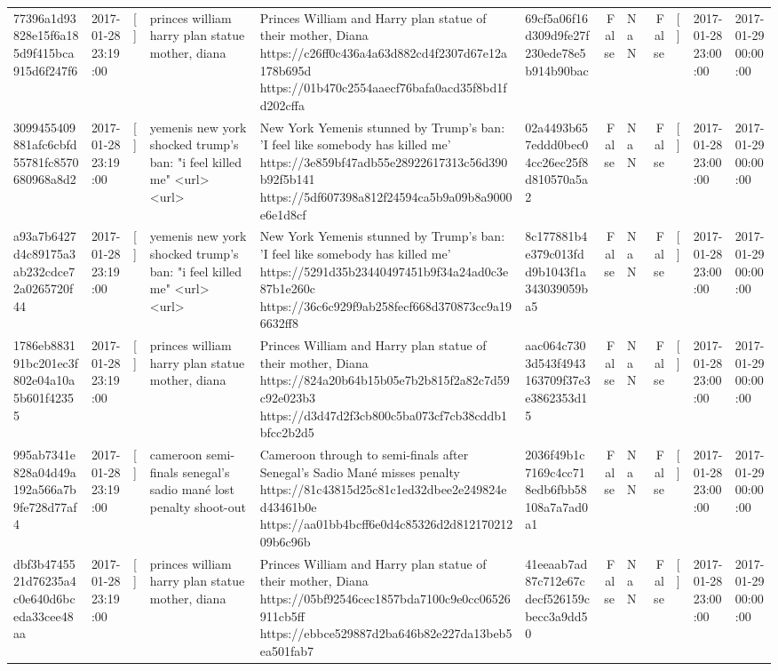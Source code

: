 \begin{tabular}{llllllrlrlll}
77396a1d93828e15f6a185d9f415bca915d6f247f6 & 2017-01-28 23:19:00 & [] & princes william harry plan statue mother, diana & Princes William and Harry plan statue of their mother, Diana https://c26ff0c436a4a63d882cd4f2307d67e12a178b695d https://01b470c2554aaecf76bafa0acd35f8bd1fd202cffa & 69cf5a06f16d309d9fe27f230ede78e5b914b90bac & False & NaN & False & [] & 2017-01-28 23:00:00 & 2017-01-29 00:00:00 \\
3099455409881afc6cbfd55781fc8570680968a8d2 & 2017-01-28 23:19:00 & [] & yemenis new york shocked trump's ban: "i feel killed me" <url> <url> & New York Yemenis stunned by Trump's ban: 'I feel like somebody has killed me' https://3e859bf47adb55e28922617313c56d390b92f5b141 https://5df607398a812f24594ca5b9a09b8a9000e6e1d8cf & 02a4493b657eddd0bec04cc26ec25f8d810570a5a2 & False & NaN & False & [] & 2017-01-28 23:00:00 & 2017-01-29 00:00:00 \\
a93a7b6427d4c89175a3ab232cdce72a0265720f44 & 2017-01-28 23:19:00 & [] & yemenis new york shocked trump's ban: "i feel killed me" <url> <url> & New York Yemenis stunned by Trump's ban: 'I feel like somebody has killed me' https://5291d35b23440497451b9f34a24ad0c3e87b1e260c https://36c6c929f9ab258fecf668d370873cc9a196632ff8 & 8c177881b4e379c013fdd9b1043f1a343039059ba5 & False & NaN & False & [] & 2017-01-28 23:00:00 & 2017-01-29 00:00:00 \\
1786eb883191bc201ec3f802e04a10a5b601f42355 & 2017-01-28 23:19:00 & [] & princes william harry plan statue mother, diana & Princes William and Harry plan statue of their mother, Diana https://824a20b64b15b05e7b2b815f2a82c7d59c92e023b3 https://d3d47d2f3cb800c5ba073cf7cb38cddb1bfcc2b2d5 & aac064c7303d543f4943163709f37e3e3862353d15 & False & NaN & False & [] & 2017-01-28 23:00:00 & 2017-01-29 00:00:00 \\
995ab7341e828a04d49a192a566a7b9fe728d77af4 & 2017-01-28 23:19:00 & [] & cameroon semi-finals senegal's sadio mané lost penalty shoot-out & Cameroon through to semi-finals after Senegal’s Sadio Mané misses penalty https://81c43815d25c81c1ed32dbee2e249824ed43461b0e https://aa01bb4bcff6e0d4c85326d2d81217021209b6c96b & 2036f49b1c7169c4cc718edb6fbb58108a7a7ad0a1 & False & NaN & False & [] & 2017-01-28 23:00:00 & 2017-01-29 00:00:00 \\
dbf3b4745521d76235a4c0e640d6bceda33cee48aa & 2017-01-28 23:19:00 & [] & princes william harry plan statue mother, diana & Princes William and Harry plan statue of their mother, Diana https://05bf92546cec1857bda7100c9e0cc06526911cb5ff https://ebbce529887d2ba646b82e227da13beb5ea501fab7 & 41eeaab7ad87c712e67cdecf526159cbecc3a9dd50 & False & NaN & False & [] & 2017-01-28 23:00:00 & 2017-01-29 00:00:00 \\

\end{tabular}
